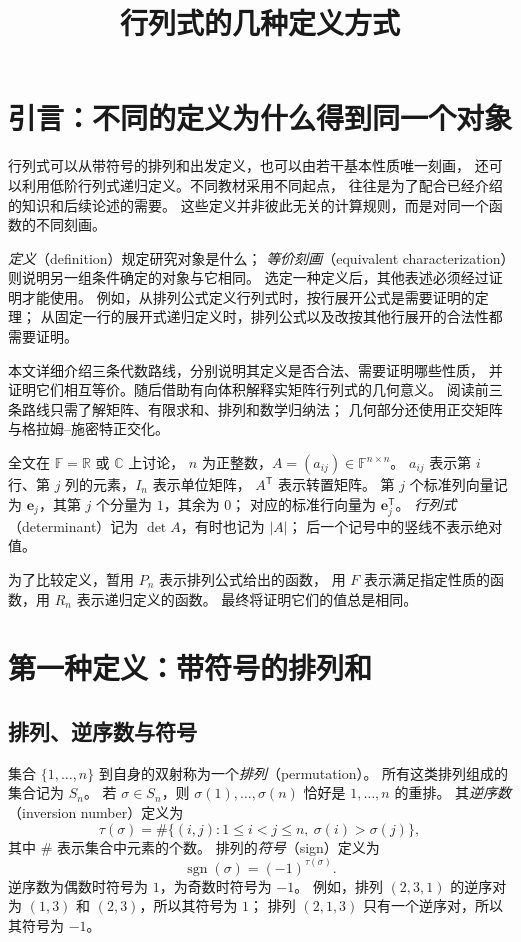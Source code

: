 \documentclass[UTF8,12pt,a4paper,fontset=fandol]{ctexart}
\title{行列式的几种定义方式}
\author{}
\date{}
\begin{document}
\maketitle
\tableofcontents

\section{引言：不同的定义为什么得到同一个对象}

行列式可以从带符号的排列和出发定义，也可以由若干基本性质唯一刻画，
还可以利用低阶行列式递归定义。不同教材采用不同起点，
往往是为了配合已经介绍的知识和后续论述的需要。
这些定义并非彼此无关的计算规则，而是对同一个函数的不同刻画。

\emph{定义}（definition）规定研究对象是什么；
\emph{等价刻画}（equivalent characterization）则说明另一组条件确定的对象与它相同。
选定一种定义后，其他表述必须经过证明才能使用。
例如，从排列公式定义行列式时，按行展开公式是需要证明的定理；
从固定一行的展开式递归定义时，排列公式以及改按其他行展开的合法性都需要证明。

本文详细介绍三条代数路线，分别说明其定义是否合法、需要证明哪些性质，
并证明它们相互等价。随后借助有向体积解释实矩阵行列式的几何意义。
阅读前三条路线只需了解矩阵、有限求和、排列和数学归纳法；
几何部分还使用正交矩阵与格拉姆--施密特正交化。

全文在 $\mathbb F=\mathbb R$ 或 $\mathbb C$ 上讨论，
$n$ 为正整数，$A=(a_{ij})\in\mathbb F^{n\times n}$。
$a_{ij}$ 表示第 $i$ 行、第 $j$ 列的元素，$I_n$ 表示单位矩阵，
$A^{\mathsf T}$ 表示转置矩阵。
第 $j$ 个标准列向量记为 $\mathbf e_j$，其第 $j$ 个分量为 $1$，其余为 $0$；
对应的标准行向量为 $\mathbf e_j^{\mathsf T}$。
\emph{行列式}（determinant）记为 $\det A$，有时也记为 $|A|$；
后一个记号中的竖线不表示绝对值。

为了比较定义，暂用 $P_n$ 表示排列公式给出的函数，
用 $F$ 表示满足指定性质的函数，用 $R_n$ 表示递归定义的函数。
最终将证明它们的值总是相同。

\section{第一种定义：带符号的排列和}
\label{sec:permutation-definition}

\subsection{排列、逆序数与符号}

集合 $\{1,\ldots,n\}$ 到自身的双射称为一个\emph{排列}（permutation）。
所有这类排列组成的集合记为 $S_n$。
若 $\sigma\in S_n$，则 $\sigma(1),\ldots,\sigma(n)$ 恰好是 $1,\ldots,n$ 的重排。
其\emph{逆序数}（inversion number）定义为
\[
  \tau(\sigma)
  =\#\{(i,j):1\leq i<j\leq n,\ \sigma(i)>\sigma(j)\},
\]
其中 $\#$ 表示集合中元素的个数。
排列的\emph{符号}（sign）定义为
\[
  \operatorname{sgn}(\sigma)=(-1)^{\tau(\sigma)}.
\]
逆序数为偶数时符号为 $1$，为奇数时符号为 $-1$。
例如，排列 $(2,3,1)$ 的逆序对为 $(1,3)$ 和 $(2,3)$，所以其符号为 $1$；
排列 $(2,1,3)$ 只有一个逆序对，所以其符号为 $-1$。
\end{document}
